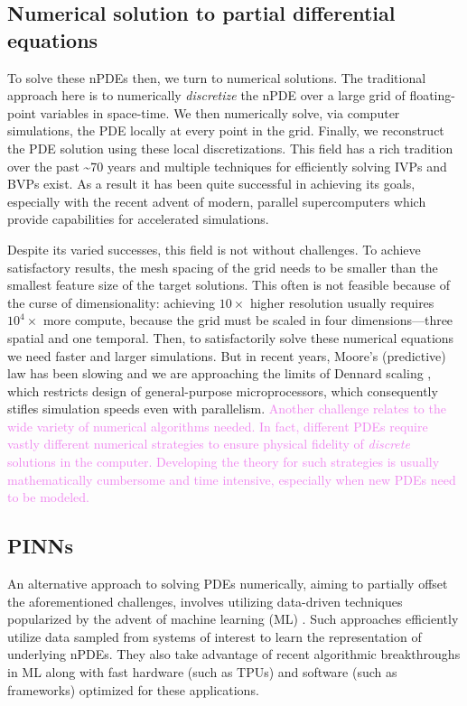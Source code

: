 \documentclass[11pt]{article}
\newcommand{\newcontent}[1]{\textcolor{violet}{#1}}
\begin{document}
\subsection{Numerical solution to partial differential equations}
\label{sec:org9007ca2}

To solve these nPDEs then, we turn to numerical solutions. The traditional
approach here is to numerically \emph{discretize} the nPDE over a large grid of
floating-point variables in space-time. We then numerically solve, via
computer simulations, the PDE locally at every point in the grid.
Finally, we reconstruct the PDE solution using these local discretizations.
This field has a rich tradition over the past \textasciitilde{}70 years \cite{quarteroni2008numerical} and multiple
techniques for efficiently solving IVPs and BVPs exist. As a result it has
been quite successful in achieving its goals, especially with the recent advent of
modern, parallel supercomputers which provide capabilities for accelerated simulations.

Despite its varied successes, this field is not without challenges. To
achieve satisfactory results, the mesh spacing of the grid needs to be
smaller than the smallest feature size of the target solutions. This often is
not feasible because of the curse of dimensionality: achieving \(10 \times\) higher
resolution usually requires \(10^4 \times\) more compute, because the
grid must be scaled in four dimensions---three spatial and one temporal.
Then, to satisfactorily solve these numerical equations we need faster and larger simulations. But in
recent years, Moore's (predictive) law has been slowing \cite{waldrop2016more} and we are
approaching the limits of Dennard scaling \cite{esmaeilzadeh2011dark}, which
restricts design of general-purpose microprocessors, which consequently
stifles simulation speeds even with parallelism.
\newcontent{
Another challenge relates to the wide variety of numerical algorithms needed.
In fact, different PDEs require vastly different numerical strategies to
ensure physical fidelity of \emph{discrete} solutions in the computer. Developing
the theory for such strategies is usually mathematically cumbersome and
time intensive, especially when new PDEs need to be modeled.
}

\subsection{PINNs}
\label{sec:orgafa16fc}
An alternative approach to solving PDEs numerically, aiming to partially
offset the aforementioned challenges, involves utilizing data-driven
techniques popularized by the advent of machine learning
(ML) \cite{bar2019learning}. Such approaches efficiently utilize data sampled
from systems of interest to learn the representation of underlying nPDEs. They
also take advantage of recent algorithmic breakthroughs in ML along with fast hardware
(such as TPUs) and software (such as frameworks) optimized for these applications.
\end{document}

